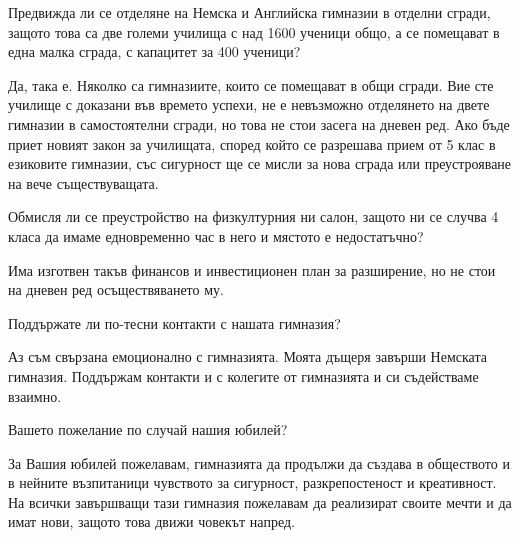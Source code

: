 \begin{multicols}{3}
Предвижда ли се отделяне на Немска и Английска гимназии в отделни сгради, защото 
това са две големи училища с над 1600 ученици общо, а се помещават в една малка 
сграда, с капацитет за 400 ученици?  

Да, така е. Няколко са гимназиите, които се помещават в общи сгради. Вие сте 
училище с доказани във времето успехи, не е невъзможно отделянето на двете 
гимназии в самостоятелни сгради, но това не стои засега на дневен ред. Ако бъде 
приет новият закон за училищата, според който се разрешава прием от 5 клас  в 
езиковите гимназии, със сигурност ще се мисли  за нова сграда или преустрояване 
на вече съществуващата.

Обмисля ли се преустройство на физкултурния ни салон, защото ни се случва 4 
класа да имаме едновременно час в него и мястото е недостатъчно?

Има изготвен такъв финансов и инвестиционен план за разширение, но не стои на 
дневен ред осъществяването му. 

Поддържате ли по-тесни контакти с нашата гимназия?

Аз съм свързана емоционално с гимназията. Моята дъщеря завърши Немската 
гимназия. Поддържам контакти и с колегите от гимназията и си съдействаме 
взаимно.

Вашето пожелание по случай нашия юбилей?

За Вашия юбилей пожелавам, гимназията да продължи да създава в обществото и в 
нейните възпитаници чувството за сигурност, разкрепостеност и креативност. На 
всички завършващи тази гимназия пожелавам да реализират своите мечти и да имат 
нови, защото това движи човекът напред.
\closearticle
\end{multicols}